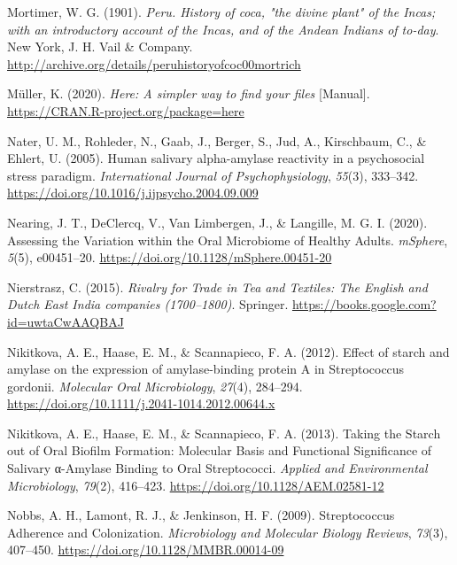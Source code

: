 \documentclass[
  letterpaper,
]{book}
\newlength{\cslhangindent}
\newlength{\cslentryspacingunit} %
\newenvironment{CSLReferences}[2] %
 {%
  \setlength{\parindent}{0pt}
  \ifodd #1
  \let\oldpar\par
  \def\par{\hangindent=\cslhangindent\oldpar}
  \fi
  \setlength{\parskip}{#2\cslentryspacingunit}
 }%
 {}
\begin{document}
\begin{CSLReferences}{1}{0}
\leavevmode{}%
Mortimer, W. G. (1901). \emph{Peru. {History} of coca, "the divine
plant" of the {Incas}; with an introductory account of the {Incas}, and
of the {Andean Indians} of to-day}. {New York, J. H. Vail \& Company}.
\url{http://archive.org/details/peruhistoryofcoc00mortrich}

\leavevmode{}%
Müller, K. (2020). \emph{Here: {A} simpler way to find your files}
{[}Manual{]}. \url{https://CRAN.R-project.org/package=here}

\leavevmode{}%
Nater, U. M., Rohleder, N., Gaab, J., Berger, S., Jud, A., Kirschbaum,
C., \& Ehlert, U. (2005). Human salivary alpha-amylase reactivity in a
psychosocial stress paradigm. \emph{International Journal of
Psychophysiology}, \emph{55}(3), 333--342.
\url{https://doi.org/10.1016/j.ijpsycho.2004.09.009}

\leavevmode{}%
Nearing, J. T., DeClercq, V., Van Limbergen, J., \& Langille, M. G. I.
(2020). Assessing the {Variation} within the {Oral Microbiome} of
{Healthy Adults}. \emph{mSphere}, \emph{5}(5), e00451--20.
\url{https://doi.org/10.1128/mSphere.00451-20}

\leavevmode{}%
Nierstrasz, C. (2015). \emph{Rivalry for {Trade} in {Tea} and
{Textiles}: {The English} and {Dutch East India} companies
(1700--1800)}. {Springer}.
\url{https://books.google.com?id=uwtaCwAAQBAJ}

\leavevmode{}%
Nikitkova, A. E., Haase, E. M., \& Scannapieco, F. A. (2012). Effect of
starch and amylase on the expression of amylase-binding protein {A} in
{Streptococcus} gordonii. \emph{Molecular Oral Microbiology},
\emph{27}(4), 284--294.
\url{https://doi.org/10.1111/j.2041-1014.2012.00644.x}

\leavevmode{}%
Nikitkova, A. E., Haase, E. M., \& Scannapieco, F. A. (2013). Taking the
{Starch} out of {Oral Biofilm Formation}: {Molecular Basis} and
{Functional Significance} of {Salivary} α-{Amylase Binding} to {Oral
Streptococci}. \emph{Applied and Environmental Microbiology},
\emph{79}(2), 416--423. \url{https://doi.org/10.1128/AEM.02581-12}

\leavevmode{}%
Nobbs, A. H., Lamont, R. J., \& Jenkinson, H. F. (2009). Streptococcus
{Adherence} and {Colonization}. \emph{Microbiology and Molecular Biology
Reviews}, \emph{73}(3), 407--450.
\url{https://doi.org/10.1128/MMBR.00014-09}


\end{CSLReferences}
\end{document}
